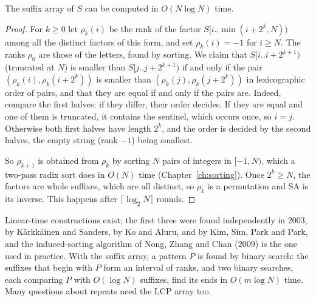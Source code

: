 \begin{theorem}\label{thm:doubling}
The suffix array of $S$ can be computed in $O(N\log N)$ time.
\end{theorem}
\begin{proof}
For $k\ge0$ let $\rho_k(i)$ be the rank of the factor $S[i..\min(i+2^k,N))$ among all the distinct factors of this form, and set $\rho_k(i)=-1$ for $i\ge N$. The ranks $\rho_0$ are those of the letters, found by sorting. We claim that $S[i..i+2^{k+1})$ (truncated at $N$) is smaller than $S[j..j+2^{k+1})$ if and only if the pair $(\rho_k(i),\rho_k(i+2^k))$ is smaller than $(\rho_k(j),\rho_k(j+2^k))$ in lexicographic order of pairs, and that they are equal if and only if the pairs are.
Indeed, compare the first halves: if they differ, their order decides. If they are equal and one of them is truncated, it contains the sentinel, which occurs once, so $i=j$. Otherwise both first halves have length $2^k$, and the order is decided by the second halves, the empty string (rank $-1$) being smallest.

So $\rho_{k+1}$ is obtained from $\rho_k$ by sorting $N$ pairs of integers in $[-1,N)$, which a two-pass radix sort does in $O(N)$ time (Chapter~\ref{ch:sorting}). Once $2^k\ge N$, the factors are whole suffixes, which are all distinct, so $\rho_k$ is a permutation and $\mathrm{SA}$ is its inverse. This happens after $\lceil\log_2N\rceil$ rounds.
\end{proof}

Linear-time constructions exist; the first three were found independently in 2003, by Kärkkäinen and Sanders, by Ko and Aluru, and by Kim, Sim, Park and Park, and the induced-sorting algorithm of Nong, Zhang and Chan (2009) is the one used in practice. With the suffix array, a pattern $P$ is found by binary search: the suffixes that begin with $P$ form an interval of ranks, and two binary searches, each comparing $P$ with $O(\log N)$ suffixes, find its ends in $O(m\log N)$ time. Many questions about repeats need the LCP array too.

